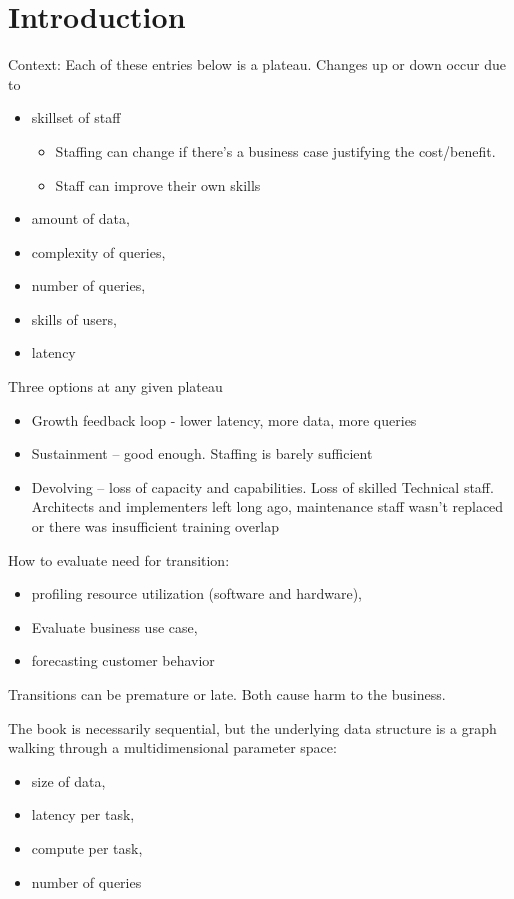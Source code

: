 \chapter{Introduction\label{sec:introduction}}

Context: Each of these entries below is a plateau. 
Changes up or down occur due to 
\begin{itemize}
    \item skillset of staff
    \begin{itemize}
        \item Staffing can change if there's a business case justifying the cost/benefit.
        \item Staff can improve their own skills
    \end{itemize}
    \item amount of data, 
    \item complexity of queries, 
    \item number of queries, 
    \item skills of users, 
    \item latency
\end{itemize}

Three options at any given plateau 
\begin{itemize}
    \item Growth feedback loop - lower latency, more data, more queries 
    \item Sustainment – good enough. Staffing is barely sufficient
    \item Devolving – loss of capacity and capabilities. Loss of skilled Technical staff. Architects and implementers left long ago, maintenance staff wasn't replaced or there was insufficient training overlap
\end{itemize}


How to evaluate need for transition: 
\begin{itemize}
    \item profiling resource utilization (software and hardware), 
    \item Evaluate business use case, 
    \item forecasting customer behavior
\end{itemize}
Transitions can be premature or late. Both cause harm to the business.


The book is necessarily sequential, but the underlying data structure is a graph walking through a multidimensional parameter space: 
\begin{itemize}
    \item size of data, 
    \item latency per task, 
    \item compute per task, 
    \item number of queries 
\end{itemize}

